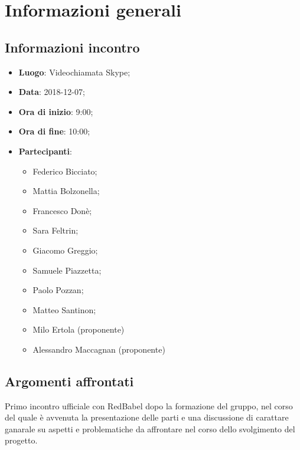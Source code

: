 \section{Informazioni generali}

\subsection{Informazioni incontro}
\begin{itemize}
\item \textbf{Luogo}: Videochiamata Skype;
\item \textbf{Data}: 2018-12-07;
\item \textbf{Ora di inizio}: 9:00;
\item \textbf{Ora di fine}: 10:00;
\item \textbf{Partecipanti}: 
	\begin{itemize}
		\item Federico Bicciato;
		\item Mattia Bolzonella;
		\item Francesco Donè;
		\item Sara Feltrin;
		\item Giacomo Greggio;
		\item Samuele Piazzetta;
		\item Paolo Pozzan;
		\item Matteo Santinon;
		\item Milo Ertola (proponente)
		\item Alessandro Maccagnan (proponente)
	\end{itemize}
\end{itemize}

\subsection{Argomenti affrontati}
Primo incontro ufficiale con RedBabel dopo la formazione del gruppo, nel corso del quale è avvenuta la presentazione delle parti e una discussione di carattare ganarale su aspetti e problematiche da affrontare nel corso dello svolgimento del progetto.
